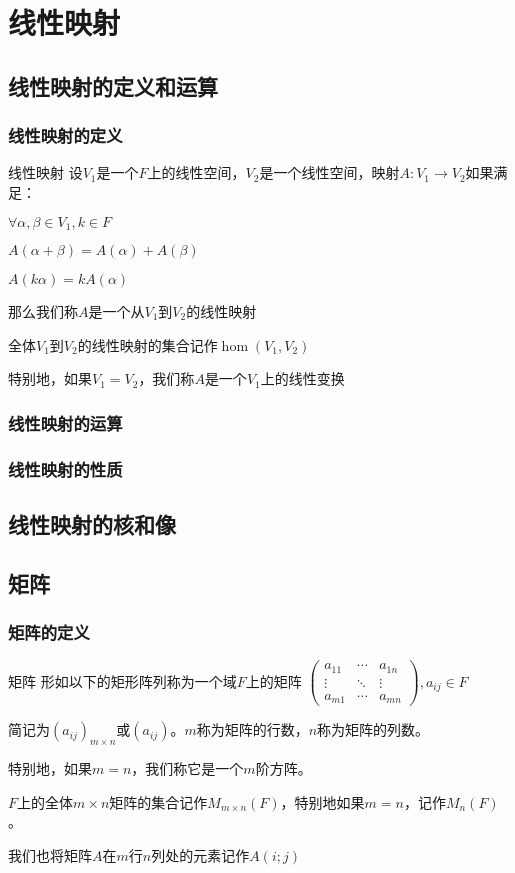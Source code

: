 \documentclass[12pt, a4paper, oneside, UTF8]{ctexbook}
\begin{document}
% 
\else
\fi
\chapter{线性映射}
	\section{线性映射的定义和运算}
		\subsection{线性映射的定义}
			\begin{defn}{线性映射}{}
				设$V_1$是一个$F$上的线性空间，$V_2$是一个线性空间，映射$A:V_1 \to V_2$如果满足：

				$\forall \alpha ,\beta \in V_1,k \in F$

				$A(\alpha+\beta )=A(\alpha )+A(\beta )$

				$A(k\alpha )=kA(\alpha )$

				那么我们称$A$是一个从$V_1$到$V_2$的线性映射

				全体$V_1$到$V_2$的线性映射的集合记作$\hom (V_1,V_2)$

				特别地，如果$V_1=V_2$，我们称$A$是一个$V_1$上的线性变换
			\end{defn}
		\subsection{线性映射的运算}
		\subsection{线性映射的性质}
	\section{线性映射的核和像}
	\section{矩阵}
		\subsection{矩阵的定义}
			\begin{defn}{矩阵}{}
				形如以下的矩形阵列称为一个域$F$上的矩阵
				$\begin{pmatrix}
					a_{11} & \cdots & a_{1n} \\
					\vdots & \ddots & \vdots \\
					a_{m1} & \cdots & a_{mn}
				\end{pmatrix},a_{ij} \in F$

				简记为$(a_{ij})_{m \times n}$或$(a_{ij})$。$m$称为矩阵的行数，$n$称为矩阵的列数。

				特别地，如果$m=n$，我们称它是一个$m$阶方阵。

				$F$上的全体$m \times n$矩阵的集合记作$M_{m \times n} (F)$，特别地如果$m=n$，记作$M_n (F)$。

				我们也将矩阵$A$在$m$行$n$列处的元素记作$A(i;j)$
			\end{defn}
\end{document}
